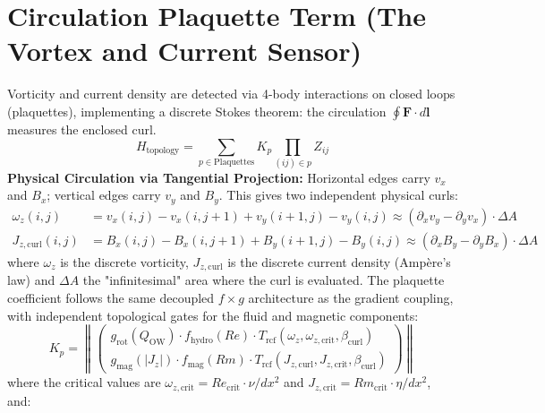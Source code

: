 \documentclass[12pt, a4paper, oneside]{report}
\begin{document}
\section{Circulation Plaquette Term (The Vortex and Current Sensor)}
\label{sec:plaquettet}
Vorticity and current density are detected via 4-body interactions on closed loops (plaquettes), implementing a discrete Stokes theorem: the circulation $\oint \mathbf{F} \cdot d\mathbf{l}$ measures the enclosed curl.
\begin{equation}
    H_{\text{topology}} = \sum_{p \in \text{Plaquettes}} K_p \prod_{(ij) \in p} Z_{ij}
\end{equation}
\textbf{Physical Circulation via Tangential Projection:} Horizontal edges carry $v_x$ and $B_x$; vertical edges carry $v_y$ and $B_y$. This gives two independent physical curls:
\begin{align}
    \omega_z(i,j) &= v_x(i,j) - v_x(i,j{+}1) + v_y(i{+}1,j) - v_y(i,j) \approx (\partial_x v_y - \partial_y v_x) \cdot \Delta A \\
    J_{z,\text{curl}}(i,j) &= B_x(i,j) - B_x(i,j{+}1) + B_y(i{+}1,j) - B_y(i,j) \approx (\partial_x B_y - \partial_y B_x) \cdot \Delta A
\end{align}
where $\omega_z$ is the discrete vorticity, $J_{z,\text{curl}}$ is the discrete current density (Amp\`ere's law) and $\Delta A$ the "infinitesimal" area where the curl is evaluated. The plaquette coefficient follows the same decoupled $f \times g$ architecture as the gradient coupling, with independent topological gates for the fluid and magnetic components:
\begin{equation}
    K_p = \left\|\begin{pmatrix} g_{\text{rot}}(Q_{\text{OW}}) \cdot f_{\text{hydro}}(Re) \cdot T_{\text{rcf}}(\omega_z, \omega_{z,\text{crit}}, \beta_{\text{curl}}) \\ g_{\text{mag}}(|J_z|) \cdot f_{\text{mag}}(Rm) \cdot T_{\text{rcf}}(J_{z,\text{curl}}, J_{z,\text{crit}}, \beta_{\text{curl}}) \end{pmatrix}\right\|
\end{equation}
where the critical values are $\omega_{z,\text{crit}} = Re_{\text{crit}} \cdot \nu / dx^2$ and $J_{z,\text{crit}} = Rm_{\text{crit}} \cdot \eta / dx^2$, and:
\end{document}
